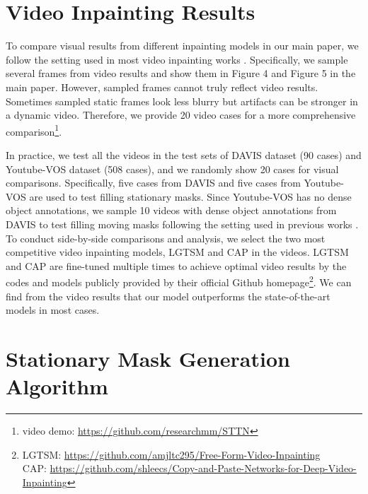 \documentclass[runningheads]{llncs}
\begin{document}
\setcounter{section}{0}
\def\thesection{\Alph{section}}
\section{Video Inpainting Results}
\label{sec:vid}

To compare visual results from different inpainting models in our main paper, we follow the setting used in most video inpainting works \cite{huang2016temporally,kim2019deep,xu2019deep}. Specifically, we sample several frames from video results and show them in Figure 4 and Figure 5 in the main paper. 
However, sampled frames cannot truly reflect video results. Sometimes sampled static frames look less blurry but artifacts can be stronger in a dynamic video. 
Therefore, we provide 20 video cases for a more comprehensive comparison\footnote{video demo: \url{https://github.com/researchmm/STTN}}.

In practice, we test all the videos in the test sets of DAVIS dataset \cite{caelles20182018} (90 cases) and Youtube-VOS dataset \cite{xu2018youtube} (508 cases), and we randomly show 20 cases for visual comparisons. 
Specifically, five cases from DAVIS and five cases from Youtube-VOS are used to test filling stationary masks. Since Youtube-VOS has no dense object annotations, we sample 10 videos with dense object annotations from DAVIS to test filling moving masks following the setting used in previous works \cite{kim2019deep,lee2019copy,xu2019deep}. 
To conduct side-by-side comparisons and analysis, we select the two most competitive video inpainting models, LGTSM \cite{chang2019learnable} and CAP \cite{lee2019copy} in the videos. LGTSM and CAP are fine-tuned multiple times to achieve optimal video results by the codes and models publicly provided by their official Github homepage\footnote{
LGTSM: \url{https://github.com/amjltc295/Free-Form-Video-Inpainting}\\
CAP: \url{https://github.com/shleecs/Copy-and-Paste-Networks-for-Deep-Video-Inpainting}
}. We can find from the video results that our model outperforms the state-of-the-art models in most cases.



\section{Stationary Mask Generation Algorithm}
\label{sec:mask}
\end{document}
